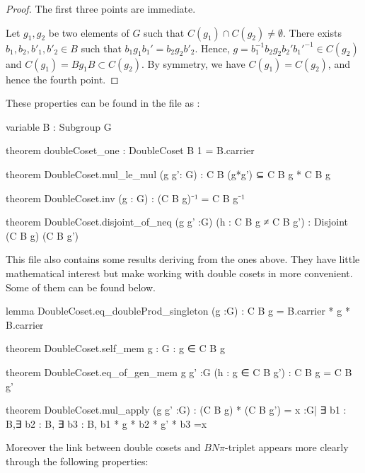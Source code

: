 \begin{proof}
    The first three points are immediate. 

    Let $g_1, g_2$ be two elements of $G$ such that $C\left( g_1 \right) \cap C\left( g_2 \right) \neq \emptyset$. There exists $b_1, b_2, b'_1, b'_2 \in B$ such that $b_1 g_1 b_1' = b_2 g_2 b'_2 $. Hence, $g = b_1^{-1} b_2 g_2 b_2' b_1'^{-1} \in  C\left( g_2 \right) $ and $C(g_1) = Bg_1B\subset C(g_2)$. By symmetry, we have $C\left( g_1 \right) = C\left( g_2 \right)$, and hence the fourth point.
\end{proof} 

These properties can be found in the  file as :
\begin{leancode}
variable {B : Subgroup G}

theorem doubleCoset_one : DoubleCoset B 1 = B.carrier

theorem DoubleCoset.mul_le_mul (g g': G) : C B (g*g') ⊆ C B g * C B g

theorem DoubleCoset.inv (g : G) : (C B g)⁻¹ = C B g⁻¹

theorem DoubleCoset.disjoint_of_neq (g g' :G) (h : C B g ≠ C B g') : 
  Disjoint (C B g) (C B g') 
\end{leancode}

This file also contains some results deriving from the ones above. They have little mathematical interest but make working with double cosets in \Lean more convenient. Some of them can be found below.

\begin{leancode}
lemma DoubleCoset.eq_doubleProd_singleton (g :G) : C B g = B.carrier * {g} * B.carrier

theorem DoubleCoset.self_mem {g : G} : g ∈ C B g

theorem DoubleCoset.eq_of_gen_mem {g g' :G} (h : g ∈ C B g') : C B g = C B g'

theorem DoubleCoset.mul_apply (g g' :G) :
  (C B g) * (C B g') = {x :G| ∃ b1 : B,∃ b2 : B, ∃ b3 : B, b1 * g * b2 * g' * b3 =x}
\end{leancode}

Moreover the link between double cosets and $BN\pi$-triplet appears more clearly through the following properties: 

